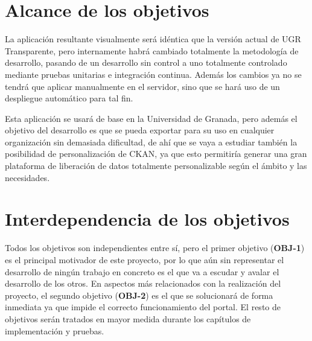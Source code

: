 \section{Alcance de los objetivos}

La aplicación resultante visualmente será idéntica que la versión actual de UGR Transparente, pero internamente habrá cambiado
totalmente la metodología de desarrollo, pasando de un desarrollo sin control a uno totalmente controlado mediante pruebas 
unitarias e integración continua. Además los cambios ya no se tendrá que aplicar manualmente en el servidor, sino que se hará
uso de un despliegue automático para tal fin.

\bigskip
Esta aplicación se usará de base en la Universidad de Granada, pero además el objetivo del desarrollo es que se pueda exportar 
para su uso en cualquier organización sin demasiada dificultad, de ahí que se vaya a estudiar también la posibilidad de 
personalización de CKAN, ya que esto permitiría generar una gran plataforma de liberación de datos totalmente personalizable
según el ámbito y las necesidades.

\section{Interdependencia de los objetivos}

Todos los objetivos son independientes entre sí, pero el primer objetivo (\textbf{OBJ-1}) es el principal motivador de este 
proyecto, por lo que aún sin representar el desarrollo de ningún trabajo en concreto es el que va a escudar y avalar el 
desarrollo de los otros. En aspectos más relacionados con la realización del proyecto, el segundo objetivo (\textbf{OBJ-2}) es
el que se solucionará de forma inmediata ya que impide el correcto funcionamiento del portal. El resto de objetivos serán 
tratados en mayor medida durante los capítulos de implementación y pruebas.

